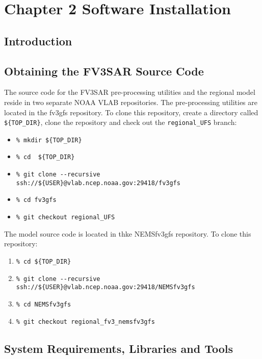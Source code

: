 \chapter{Chapter 2 Software Installation}
 
\section{Introduction}
\section{Obtaining the FV3SAR Source Code} \label{obtain_src}
The source code for the FV3SAR pre-processing utilities and the regional model reside in two separate 
NOAA VLAB repositories.  The pre-processing utilities are located in the fv3gfs repository.  To clone
this repository, create a directory called \verb|${TOP_DIR}|, clone the repository and check out the 
\verb|regional_UFS| branch:

    \begin{itemize}
       \item[] \verb|% mkdir ${TOP_DIR}|
       \item[] \verb|% cd  ${TOP_DIR}|
       \item[] \verb|% git clone --recursive ssh://${USER}@vlab.ncep.noaa.gov:29418/fv3gfs|
       \item[] \verb|% cd fv3gfs|
       \item[] \verb|% git checkout regional_UFS|
    \end{itemize}

The model source code is located in thke NEMSfv3gfs repository.  To clone this repository:

    \begin{enumerate}
       \item[] \verb|% cd ${TOP_DIR}|
       \item[] \verb|% git clone --recursive ssh://${USER}@vlab.ncep.noaa.gov:29418/NEMSfv3gfs|
       \item[] \verb|% cd NEMSfv3gfs|
       \item[] \verb|% git checkout regional_fv3_nemsfv3gfs|
    \end{enumerate}

\section{System Requirements, Libraries and Tools}

